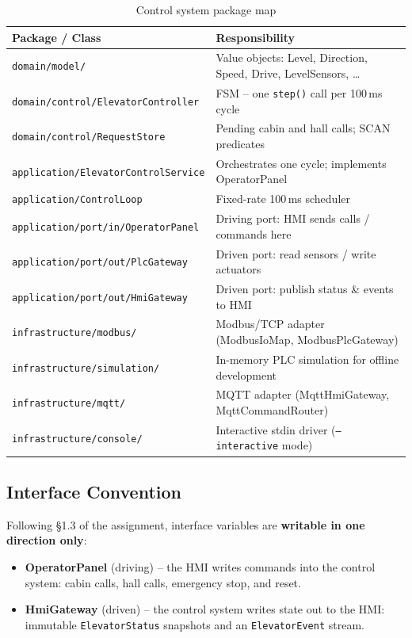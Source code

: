 \documentclass[12pt,a4paper]{article}
\begin{document}
\begin{table}[H]
\centering
\begin{tabularx}{\textwidth}{lX}
\toprule
\textbf{Package / Class} & \textbf{Responsibility} \\
\midrule
\texttt{domain/model/}                      & Value objects: Level, Direction, Speed, Drive, LevelSensors, \ldots \\
\texttt{domain/control/ElevatorController}  & FSM -- one \texttt{step()} call per 100\,ms cycle \\
\texttt{domain/control/RequestStore}        & Pending cabin and hall calls; SCAN predicates \\
\texttt{application/ElevatorControlService} & Orchestrates one cycle; implements OperatorPanel \\
\texttt{application/ControlLoop}            & Fixed-rate 100\,ms scheduler \\
\texttt{application/port/in/OperatorPanel}  & Driving port: HMI sends calls / commands here \\
\texttt{application/port/out/PlcGateway}    & Driven port: read sensors / write actuators \\
\texttt{application/port/out/HmiGateway}    & Driven port: publish status \& events to HMI \\
\texttt{infrastructure/modbus/}             & Modbus/TCP adapter (ModbusIoMap, ModbusPlcGateway) \\
\texttt{infrastructure/simulation/}         & In-memory PLC simulation for offline development \\
\texttt{infrastructure/mqtt/}               & MQTT adapter (MqttHmiGateway, MqttCommandRouter) \\
\texttt{infrastructure/console/}            & Interactive stdin driver (\texttt{--interactive} mode) \\
\bottomrule
\end{tabularx}
\caption{Control system package map}
\end{table}

\clearpage
\subsection{Interface Convention}

Following §1.3 of the assignment, interface variables are \textbf{writable in one
direction only}:

\begin{itemize}
    \item \textbf{OperatorPanel} (driving) -- the HMI writes commands into the
          control system: cabin calls, hall calls, emergency stop, and reset.
    \item \textbf{HmiGateway} (driven) -- the control system writes state out to
          the HMI: immutable \texttt{ElevatorStatus} snapshots and an
          \texttt{ElevatorEvent} stream.
\end{itemize}
\end{document}

